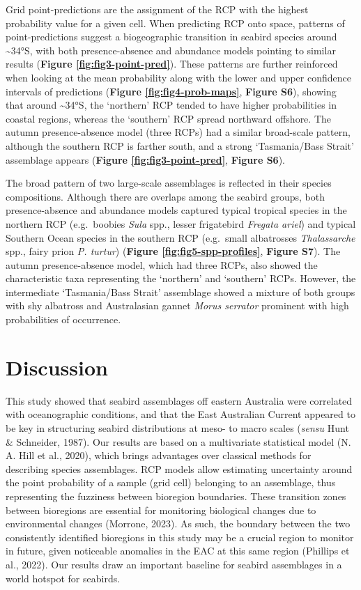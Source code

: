 \documentclass{article}
\begin{document}
\begin{linenumbers}
Grid point-predictions are the assignment of the RCP with the highest probability value for a given cell. When predicting RCP onto space, patterns of point-predictions suggest a biogeographic transition in seabird species around \textasciitilde34°S, with both presence-absence and abundance models pointing to similar results (\textbf{Figure \ref{fig:fig3-point-pred}}). These patterns are further reinforced when looking at the mean probability along with the lower and upper confidence intervals of predictions (\textbf{Figure \ref{fig:fig4-prob-maps}}, \textbf{Figure S6}), showing that around \textasciitilde34°S, the `northern' RCP tended to have higher probabilities in coastal regions, whereas the `southern' RCP spread northward offshore. The autumn presence-absence model (three RCPs) had a similar broad-scale pattern, although the southern RCP is farther south, and a strong `Tasmania/Bass Strait' assemblage appears (\textbf{Figure \ref{fig:fig3-point-pred}}, \textbf{Figure S6}).

The broad pattern of two large-scale assemblages is reflected in their species compositions. Although there are overlaps among the seabird groups, both presence-absence and abundance models captured typical tropical species in the northern RCP (e.g.~boobies \emph{Sula} spp., lesser frigatebird \emph{Fregata ariel}) and typical Southern Ocean species in the southern RCP (e.g.~small albatrosses \emph{Thalassarche} spp., fairy prion \emph{P. turtur}) (\textbf{Figure \ref{fig:fig5-spp-profiles}}, \textbf{Figure S7}). The autumn presence-absence model, which had three RCPs, also showed the characteristic taxa representing the `northern' and `southern' RCPs. However, the intermediate `Tasmania/Bass Strait' assemblage showed a mixture of both groups with shy albatross and Australasian gannet \emph{Morus serrator} prominent with high probabilities of occurrence.

\hypertarget{discussion}{%
\section{Discussion}\label{discussion}}

This study showed that seabird assemblages off eastern Australia were correlated with oceanographic conditions, and that the East Australian Current appeared to be key in structuring seabird distributions at meso- to macro scales (\emph{sensu} Hunt \& Schneider, 1987). Our results are based on a multivariate statistical model (N. A. Hill et al., 2020), which brings advantages over classical methods for describing species assemblages. RCP models allow estimating uncertainty around the point probability of a sample (grid cell) belonging to an assemblage, thus representing the fuzziness between bioregion boundaries. These transition zones between bioregions are essential for monitoring biological changes due to environmental changes (Morrone, 2023). As such, the boundary between the two consistently identified bioregions in this study may be a crucial region to monitor in future, given noticeable anomalies in the EAC at this same region (Phillips et al., 2022). Our results draw an important baseline for seabird assemblages in a world hotspot for seabirds.


\end{linenumbers}
\end{document}
